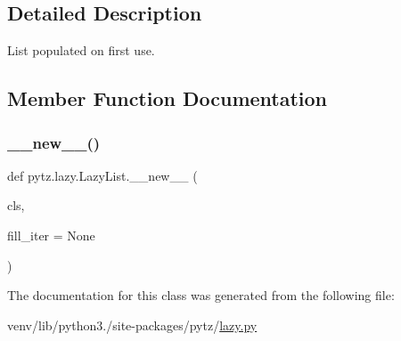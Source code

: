 \subsection{Detailed Description}
\begin{DoxyVerb}List populated on first use.\end{DoxyVerb}
 

\subsection{Member Function Documentation}
\mbox{\label{classpytz_1_1lazy_1_1LazyList_ac09f0492047f1aff6916555931eaa2d6}} 
\subsubsection{\texorpdfstring{\+\_\+\+\_\+new\+\_\+\+\_\+()}{\_\_new\_\_()}}
{\footnotesize\ttfamily def pytz.\+lazy.\+Lazy\+List.\+\_\+\+\_\+new\+\_\+\+\_\+ (\begin{DoxyParamCaption}\item[{}]{cls,  }\item[{}]{fill\+\_\+iter = {\ttfamily None} }\end{DoxyParamCaption})}



The documentation for this class was generated from the following file\+:\begin{DoxyCompactItemize}
\item 
venv/lib/python3./site-\/packages/pytz/\hyperlink{lazy_8py}{lazy.\+py}\end{DoxyCompactItemize}
